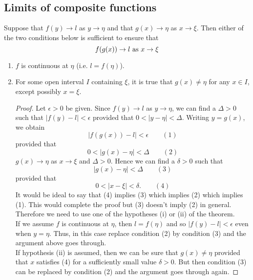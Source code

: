 \documentclass[10pt, a4paper]{article}
\begin{document}
\subsection{Limits of composite functions}

\begin{theorem}\label{thm_lim_compfunc}
    Suppose that $f(y) \rightarrow l$ as $y \rightarrow \eta$ and that $g(x) \rightarrow \eta$ as $x \rightarrow \xi$. Then either of the two conditions below is sufficient to ensure that
    $$f(g(x)) \rightarrow l \textnormal{ as } x \rightarrow \xi$$
    \begin{enumerate}[label = (\roman*)]
        \item $f$ is continuous at $\eta$ (i.e. $l = f(\eta)$).
        \item For some open interval $I$ containing $\xi$, it is true that $g(x) \neq \eta$ for any $x \in I$, except possibly $x = \xi$.
        \begin{proof}
            Let $\epsilon > 0$ be given. Since $f(y) \rightarrow l$ as $y \rightarrow \eta$, we can find a $\Delta > 0$ such that $|f(y) - l| < \epsilon$ provided that $0 < |y - \eta| < \Delta$. Writing $y = g(x)$, we obtain
            $$|f(g(x)) - l| < \epsilon\qquad(1)$$
            provided that
            $$0 < |g(x) - \eta| < \Delta\qquad(2)$$
            $g(x) \rightarrow \eta$ as $x \rightarrow \xi$ and $\Delta > 0$. Hence we can find a $\delta > 0$ such that
            $$|g(x) - \eta| < \Delta\qquad(3)$$
            provided that
            $$0 < |x - \xi| < \delta.\qquad(4)$$
            It would be ideal to say that (4) implies (3) which implies (2) which implies (1). This would complete the proof but (3) doesn't imply (2) in general. Therefore we need to use one of the hypotheses (i) or (ii) of the theorem. \\
            If we assume $f$ is continuous at $\eta$, then $l = f(\eta)$ and so $|f(y) - l| < \epsilon$ even when $y = \eta$. Thus, in this case replace condition (2) by condition (3) and the argument above goes through. \\
            If hypothesis (ii) is assumed, then we can be sure that $g(x) \neq \eta$ provided that $x$ satisfies (4) for a sufficiently small value $\delta > 0$. But then condition (3) can be replaced by condition (2) and the argument goes through again.
        \end{proof}
    \end{enumerate}
\end{theorem}
\end{document}
